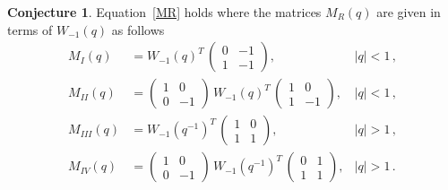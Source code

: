 \documentclass[12pt,reqno]{amsart}
\theoremstyle{definition}
\newtheorem{conjecture}[theorem]{Conjecture}
\begin{document}
\begin{conjecture} 
\label{conj.41M0}  
Equation~\eqref{MR} holds where the matrices $M_R(q)$ are
given in terms of $W_{-1}(q)$ as follows
\begin{subequations}
\begin{align}
  \label{M41I}
  M_I(q)
  &= W_{-1}(q)^T \,
    \begin{pmatrix}
      0 & -1 \\
      1 & -1
    \end{pmatrix}, & |q|<1 \,,
  \\
  \label{M41II}
  M_{II}(q)
  &= \begin{pmatrix}
    1 & 0 \\
    0 & -1
  \end{pmatrix} \, W_{-1}(q)^T \,
        \begin{pmatrix}
          1 & 0 \\
          1 &-1
        \end{pmatrix}, & |q| <1 \,,
  \\
  \label{M41III}
  M_{III}(q)
  &=
    W_{-1}(q^{-1})^T \,
    \begin{pmatrix}
      1 & 0 \\
      1 & 1 \end{pmatrix}, & |q| >1 \,,
  \\
  \label{M41IV}
  M_{IV}(q)
  &=\begin{pmatrix}
    1 & 0 \\
    0 & -1
  \end{pmatrix} \,
        W_{-1}(q^{-1})^T \,
        \begin{pmatrix}
          0 & 1 \\
          1 & 1
        \end{pmatrix}, & |q|>1 \,.
\end{align}
\end{subequations}
\end{conjecture}
\end{document}
